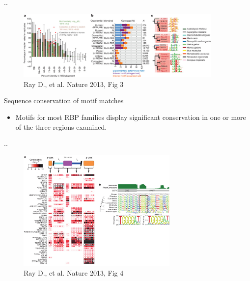 \documentclass[professionalfont, 12pt, default]{beamer}
\providecommand{\tightlist}{%
    \setlength{\itemsep}{0pt}\setlength{\parskip}{0pt}}
\begin{document}
\begin{frame}{..}

\begin{figure}
\centering
\includegraphics[width=0.90000\textwidth]{img/f3.jpg}
\caption{Ray D., et al. Nature 2013, Fig 3}
\end{figure}

\end{frame}

\begin{frame}{Sequence conservation of motif matches}

\begin{itemize}
\tightlist
\item
  Motifs for most RBP families display significant conservation in one
  or more of the three regions examined.
\end{itemize}

\end{frame}

\begin{frame}{..}

\begin{figure}
\centering
\includegraphics[width=0.70000\textwidth]{img/f4.jpg}
\caption{Ray D., et al. Nature 2013, Fig 4}
\end{figure}

\end{frame}
\end{document}
